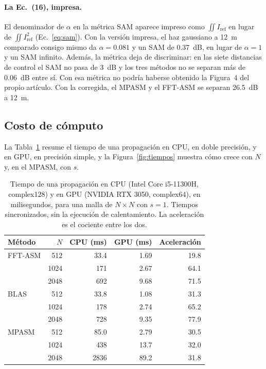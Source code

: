 \paragraph{La Ec.~(16), impresa.} El denominador de $\alpha$ en la métrica SAM
aparece impreso como $\iint I_\mathrm{ref}$ en lugar de
$\iint I_\mathrm{ref}^2$ (Ec.~\eqref{eq:sam}). Con la versión impresa, el haz
gaussiano a \SI{12}{m} comparado consigo mismo da $\alpha = 0.081$ y un SAM de
\SI{0.37}{dB}, en lugar de $\alpha = 1$ y un SAM infinito. Además, la métrica deja de
discriminar: en las siete distancias de control el SAM no pasa de
\SI{3}{dB} y los tres métodos no se separan más de \SI{0.06}{dB} entre sí. Con
esa métrica no podría haberse obtenido la Figura~4 del propio artículo. Con la
corregida, el MPASM y el FFT-ASM se separan \SI{26.5}{dB} a \SI{12}{m}.

\subsection{Costo de cómputo}

La Tabla~\ref{tab:tiempos} resume el tiempo de una propagación en CPU, en
doble precisión, y en GPU, en precisión simple, y la
Figura~\ref{fig:tiempos} muestra cómo crece con $N$ y, en el MPASM, con $s$.

\begin{table}[htbp]
  \centering
  \caption[Tiempo de una propagación en CPU y en GPU]{Tiempo de una propagación en CPU (Intel Core i5-11300H, complex128)
  y en GPU (NVIDIA RTX 3050, complex64), en milisegundos, para una malla de
  $N\times N$ con $s = 1$. Tiempos sincronizados, sin la ejecución de
  calentamiento. La aceleración es el cociente entre los dos.}
  \label{tab:tiempos}
  \begin{tabular}{lrrrr}
    \toprule
    Método & $N$ & CPU (ms) & GPU (ms) & Aceleración \\
    \midrule
    FFT-ASM & 512  & 33.4  & 1.69  & 19.8 \\
            & 1024 & 171   & 2.67  & 64.1 \\
            & 2048 & 692   & 9.68  & 71.5 \\
    \midrule
    BLAS    & 512  & 33.8  & 1.08  & 31.3 \\
            & 1024 & 178   & 2.74  & 65.2 \\
            & 2048 & 728   & 9.35  & 77.9 \\
    \midrule
    MPASM   & 512  & 85.0  & 2.79  & 30.5 \\
            & 1024 & 438   & 13.7  & 32.0 \\
            & 2048 & 2836  & 89.2  & 31.8 \\
    \bottomrule
  \end{tabular}
\end{table}

